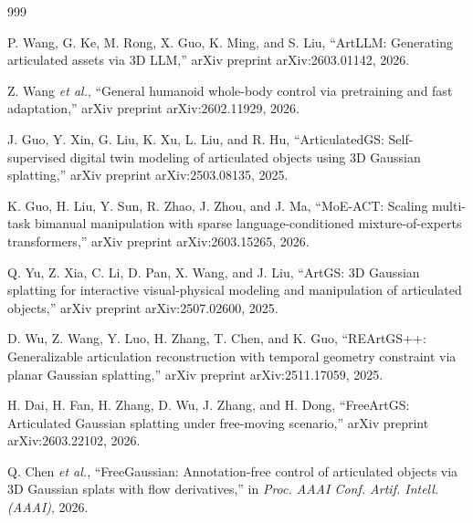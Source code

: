 \documentclass[12pt,a4paper,oneside]{report}
\begin{document}
\begin{thebibliography}{999}

P. Wang, G. Ke, M. Rong, X. Guo, K. Ming, and S. Liu, ``ArtLLM: Generating articulated assets via {3D} LLM,'' arXiv preprint arXiv:2603.01142, 2026.




Z. Wang \textit{et al.}, ``General humanoid whole-body control via pretraining and fast adaptation,'' arXiv preprint arXiv:2602.11929, 2026.




J. Guo, Y. Xin, G. Liu, K. Xu, L. Liu, and R. Hu, ``{ArticulatedGS}: Self-supervised digital twin modeling of articulated objects using {3D} Gaussian splatting,'' arXiv preprint arXiv:2503.08135, 2025.




K. Guo, H. Liu, Y. Sun, R. Zhao, J. Zhou, and J. Ma, ``MoE-ACT: Scaling multi-task bimanual manipulation with sparse language-conditioned mixture-of-experts transformers,'' arXiv preprint arXiv:2603.15265, 2026.




Q. Yu, Z. Xia, C. Li, D. Pan, X. Wang, and J. Liu, ``{ArtGS}: {3D} Gaussian splatting for interactive visual-physical modeling and manipulation of articulated objects,'' arXiv preprint arXiv:2507.02600, 2025.




D. Wu, Z. Wang, Y. Luo, H. Zhang, T. Chen, and K. Guo, ``{REArtGS++}: Generalizable articulation reconstruction with temporal geometry constraint via planar Gaussian splatting,'' arXiv preprint arXiv:2511.17059, 2025.




H. Dai, H. Fan, H. Zhang, D. Wu, J. Zhang, and H. Dong, ``{FreeArtGS}: Articulated Gaussian splatting under free-moving scenario,'' arXiv preprint arXiv:2603.22102, 2026.




Q. Chen \textit{et al.}, ``{FreeGaussian}: Annotation-free control of articulated objects via {3D} Gaussian splats with flow derivatives,'' in \textit{Proc. AAAI Conf. Artif. Intell. (AAAI)}, 2026.




\end{thebibliography}
\end{document}
